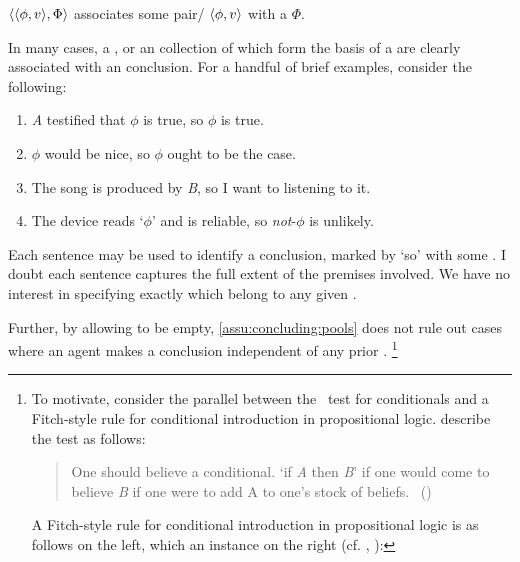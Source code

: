 \begin{note}
  \begin{notation}
  \item
    \(\langle \langle \phi, v \rangle, \Phi \rangle\) associates some pair/\eval{} \(\langle \phi, v \rangle\) with a \pool{} \(\Phi\).
  \end{notation}

  In many cases, a \pool{}, or an collection of \evalN{} which form the basis of a \pool{} are clearly associated with an conclusion.
  For a handful of brief examples, consider the following:

  \begin{enumerate}[label=\arabic*., ref=(\arabic*), noitemsep]
  \item
    \emph{A} testified that \(\phi\) is true, so \(\phi\) is true.
  \item
    \(\phi\) would be nice, so \(\phi\) ought to be the case.
  \item
    The song is produced by \emph{B}, so I want to listening to it.
  \item
    The device reads `\(\phi\)' and is reliable, so \emph{not}-\(\phi\) is unlikely.
  \end{enumerate}

  Each sentence may be used to identify a conclusion, marked by `so' with some \pool{}.
  I doubt each sentence captures the full extent of the premises involved.
  We have no interest in specifying exactly which \evalN{} belong to any given \pool{}.

  Further, by allowing  to be empty, \autoref{assu:concluding:pools} does not rule out cases where an agent makes a conclusion independent of any prior .%
  \footnote{
    To motivate, consider the parallel between the~\citeauthor{Ramsey:1929tf} test for conditionals and a Fitch-style rule for conditional introduction in propositional logic.
    \textcite{Read:1995wf} describe the test as follows:

    \begin{quote}
      One should believe a conditional. `if \emph{A} then \emph{B}' if one would come to believe \emph{B} if one were to add A to one's stock of beliefs.%
      \mbox{ }\hfill\mbox{(\citeyear[47]{Read:1995wf})}
    \end{quote}

    A Fitch-style rule for conditional introduction in propositional logic is as follows on the left, which an instance on the right (cf. \cite[206]{Barwise:1999tu}, \cite{Pelletier:2021vp}):

}
\end{note}
